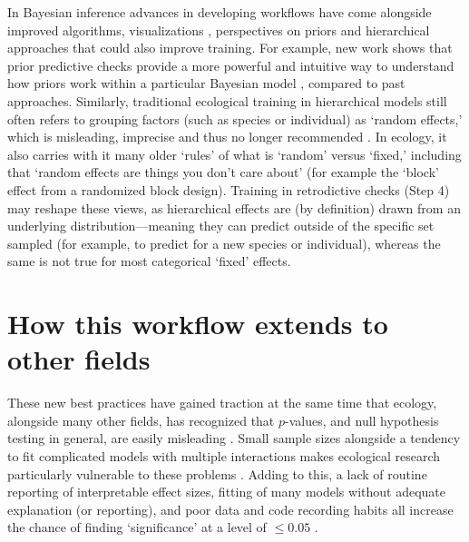 \documentclass[11pt]{article}
\newcommand{\R}[1]{\label{}\linelabel{#1}}
\begin{document}
In Bayesian inference\R{mobe} advances in developing workflows have come alongside improved algorithms, visualizations \citep[e.g.][]{betanworkflow,vandeschoot2021,gabryvis}, perspectives on priors \citep{BDA,regotherstories,betanprior}  and hierarchical approaches that could also improve training. %
For example, new work shows that prior predictive checks provide a more powerful and intuitive way to understand how priors work within a particular Bayesian model \citep{betanprior}, compared to past approaches. Similarly, traditional ecological training in hierarchical models still often refers to grouping factors (such as species or individual) as `random effects,' which is misleading, imprecise and thus no longer recommended \citep{gelmanhill}. In ecology, it also carries with it many older `rules' of what is `random' versus `fixed,' including that `random effects are things you don't care about' (for example the `block' effect from a randomized block design). Training in retrodictive checks (Step 4) may reshape these views, as hierarchical effects are (by definition) drawn from an underlying distribution---meaning they can predict outside of the specific set sampled (for example, to predict for a new species or individual), whereas the same is not true for most categorical `fixed' effects.

\section*{How this workflow extends to other fields} 

These new best practices have gained traction at the same time that ecology, alongside many other fields, has recognized that $p$-values, and null hypothesis testing in general, are easily misleading \citep{gelman2017statistical,ferraro2020feature,filazzola2021replication,fraser2020role}. Small sample sizes alongside a tendency to fit complicated models with multiple interactions makes ecological research particularly vulnerable to these problems \citep{gelman2015connection}. Adding to this, a lack of routine reporting of interpretable effect sizes, fitting of many models without adequate explanation (or reporting), and poor data and code recording habits all increase the chance of finding `significance' at a level of $\le0.05$ \citep{halsey2015,loken2017}. 
\end{document}
